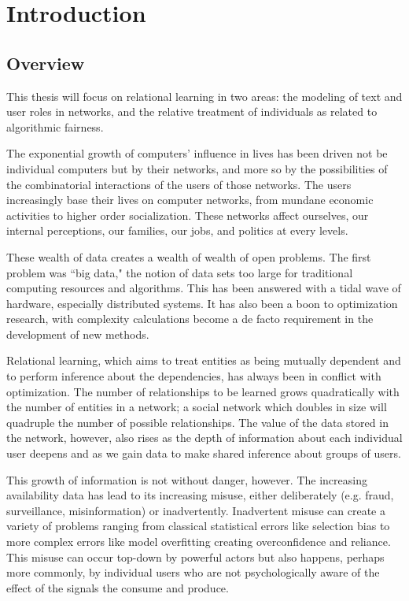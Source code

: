 \chapter{Introduction}

\section{Overview}

This thesis will focus on relational learning in two areas: the modeling of text and user roles in networks, and the relative treatment of individuals as related to algorithmic fairness.  

The exponential growth of computers' influence in lives has been driven not be individual computers but by their networks, and more so by the possibilities of the combinatorial interactions of the users of those networks.  The users increasingly base their lives on computer networks, from mundane economic activities to higher order socialization.  These networks affect ourselves, our internal perceptions, our families, our jobs, and politics at every levels.

These wealth of data creates a wealth of wealth of open problems.  The first problem was ``big data," the notion of data sets too large for traditional computing resources and algorithms.  This has been answered with a tidal wave of hardware, especially distributed systems.  It has also been a boon to optimization research, with complexity calculations become a de facto requirement in the development of new methods.

Relational learning, which aims to treat entities as being mutually dependent and to perform inference about the dependencies, has always been in conflict with optimization.  The number of relationships to be learned grows quadratically with the number of entities in a network; a social network which doubles in size will quadruple the number of possible relationships.  The value of the data stored in the network, however, also rises as the depth of information about each individual user deepens and as we gain data to make shared inference about groups of users.

This growth of information is not without danger, however.  The increasing availability data has lead to its increasing misuse, either deliberately (e.g. fraud, surveillance, misinformation) or inadvertently.  Inadvertent misuse can create a variety of problems ranging from classical statistical errors like selection bias to more complex errors like model overfitting creating overconfidence and reliance.  This misuse can occur top-down by powerful actors but also happens, perhaps more commonly, by individual users who are not psychologically aware of the effect of the signals the consume and produce.



